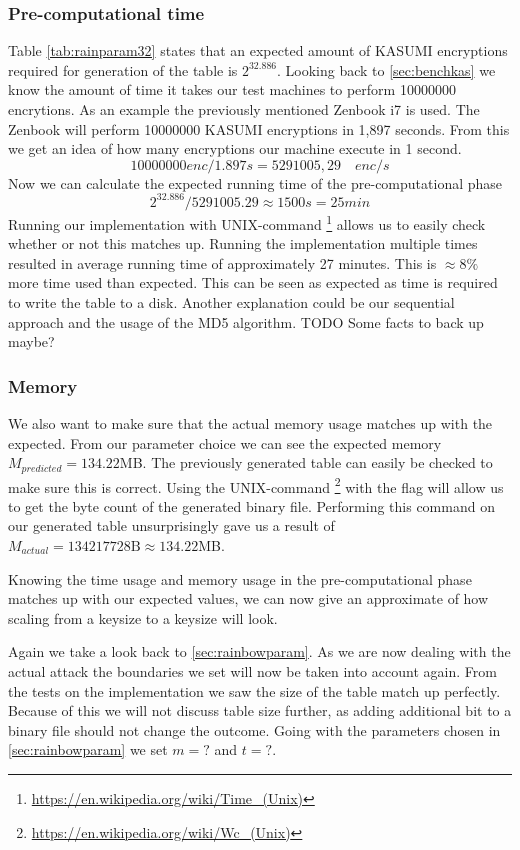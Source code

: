 \subsubsection{Pre-computational time}
Table \ref{tab:rainparam32} states that an expected amount of
KASUMI encryptions required for generation of the table is
$2^{32.886}$. Looking back to \ref{sec:benchkas} we know the
amount of time it takes our test machines to perform 10000000 encrytions. As an
example the previously mentioned Zenbook i7 is used. The
Zenbook will perform 10000000 KASUMI encryptions in 1,897
seconds. From this we get an idea of how many encryptions our
machine execute in 1 second.
\[10000000 enc / 1.897 s = 5291005,29 \quad enc/s\]
Now we can calculate the expected running time of the
pre-computational phase
\[2^{32.886} / 5291005.29 \approx 1500s = 25 min \]
Running our implementation with UNIX-command
\footnote{\url{https://en.wikipedia.org/wiki/Time_(Unix)}}
allows us to easily check whether or not this matches up. Running the
implementation multiple times resulted in average running time of
approximately 27 minutes. This is $\approx8\%$ more time used than
expected. This can be seen as expected as time is required to write
the table to a disk. Another explanation could be our sequential
approach and the usage of the MD5 algorithm. TODO Some facts to back up maybe?
\subsubsection{Memory}
We also want to make sure that the actual memory usage matches up with
the expected. From our parameter choice we can see the expected memory
$M_{predicted}=134.22$MB. The previously generated table can easily be
checked to make sure this is correct. Using the UNIX-command
\footnote{\url{https://en.wikipedia.org/wiki/Wc_(Unix)}} with
the  flag will allow us to get the byte count of the
generated binary file. Performing this command on our generated table
unsurprisingly gave us a result of
$M_{actual}=134217728\text{B}\approx134.22$MB.

Knowing the time usage and memory usage in the pre-computational phase
matches up with our expected values, we can now give an approximate of
how scaling from a  keysize to a  keysize
will look.

Again we take a look back to \ref{sec:rainbowparam}. As we are now
dealing with the actual  attack the boundaries we set
will now be taken into account again. From the tests on the
 implementation we saw the size of the table match up
perfectly. Because of this we will not discuss table size further, as
adding additional bit to a binary file should not change the outcome.
Going with the parameters chosen in \ref{sec:rainbowparam} we set
$m=?$ and $t=?$.
